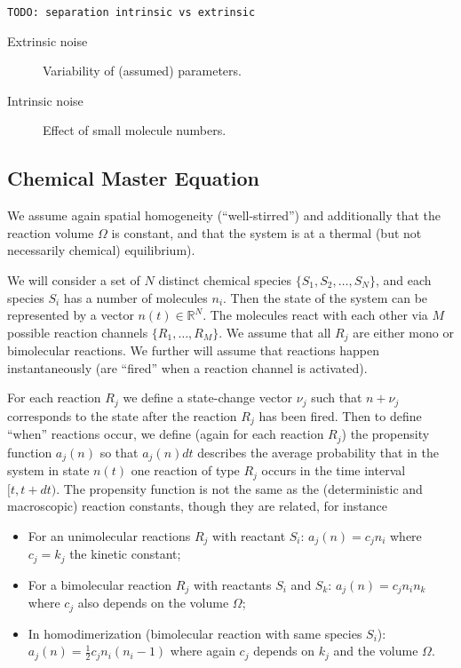 \documentclass[a4paper]{article}
\newcommand{\todo}[1]{\texttt{TODO: #1}}
\theoremstyle{plain}
\theoremstyle{definition}
\theoremstyle{remark}
\begin{document}
\todo{separation intrinsic vs extrinsic }

\begin{description}
  \item[Extrinsic noise] Variability of (assumed) parameters.
  \item[Intrinsic noise] Effect of small molecule numbers.
\end{description}

\subsection{Chemical Master Equation}

We assume again spatial homogeneity (``well-stirred'') and additionally that
the reaction volume $\Omega$ is constant, and that the system is at a thermal
(but not necessarily chemical) equilibrium).

We will consider a set of $N$ distinct chemical species $\{S_1, S_2, \ldots,
S_N\}$, and each species $S_i$ has a number of molecules $n_i$. Then the state
of the system can be represented by a vector $n(t) \in \mathbb{R}^N$. The
molecules react with each other via $M$ possible reaction channels $\{R_1,
\ldots, R_M\}$. We assume that all $R_j$ are either mono or bimolecular
reactions. We further will assume that reactions happen instantaneously (are
``fired'' when a reaction channel is activated).

For each reaction $R_j$ we define a state-change vector $\nu_j$ such that $n +
\nu_j$ corresponds to the state after the reaction $R_j$ has been fired. Then to
define ``when'' reactions occur, we define (again for each reaction $R_j$) the
propensity function $a_j(n)$ so that $a_j(n) dt$ describes the average
probability that in the system in state $n(t)$ one reaction of type $R_j$
occurs in the time interval $[t, t + dt)$. The propensity function is not the
same as the (deterministic and macroscopic) reaction constants, though they
are related, for instance
\begin{itemize}
  \item For an unimolecular reactions $R_j$ with reactant $S_i$: $a_j(n) = c_j
    n_i$ where $c_j = k_j$ the kinetic constant;
  \item For a bimolecular reaction $R_j$ with reactants $S_i$ and $S_k$:
    $a_j(n) = c_j n_i n_k$ where $c_j$ also depends on the volume $\Omega$;
  \item In homodimerization (bimolecular reaction with same species $S_i$):
    $a_j(n) = \frac{1}{2} c_j n_i (n_i-1)$ where again $c_j$ depends on $k_j$
    and the volume $\Omega$.
\end{itemize}
\end{document}
